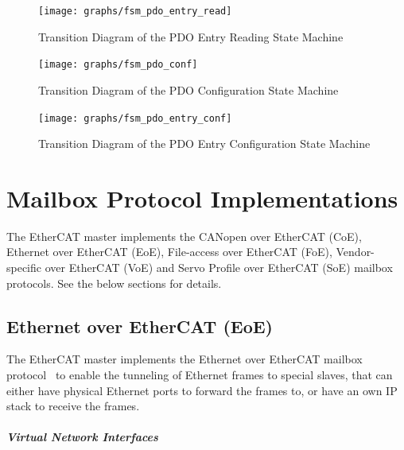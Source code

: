 \documentclass[a4paper,12pt,BCOR6mm,bibtotoc,idxtotoc]{scrbook}
\begin{document}
\begin{figure}[htbp]
  \centering
  \texttt{[image: graphs/fsm\_pdo\_entry\_read]}
  \caption{Transition Diagram of the PDO Entry Reading State Machine}
  \label{fig:fsm-pdo-entry-read}
\end{figure}

\begin{figure}[htbp]
  \centering
  \texttt{[image: graphs/fsm\_pdo\_conf]}
  \caption{Transition Diagram of the PDO Configuration State Machine}
  \label{fig:fsm-pdo-conf}
\end{figure}

\begin{figure}[htbp]
  \centering
  \texttt{[image: graphs/fsm\_pdo\_entry\_conf]}
  \caption{Transition Diagram of the PDO Entry Configuration State Machine}
  \label{fig:fsm-pdo-entry-conf}
\end{figure}


\chapter{Mailbox Protocol Implementations}

The EtherCAT master implements the CANopen over EtherCAT (CoE), Ethernet over
EtherCAT (EoE), File-access over EtherCAT (FoE), Vendor-specific over EtherCAT
(VoE) and Servo Profile over EtherCAT (SoE) mailbox protocols. See the below
sections for details.


\section{Ethernet over EtherCAT (EoE)}
\label{sec:eoe}

The EtherCAT master implements the
Ethernet over EtherCAT mailbox protocol~\cite[sec.~5.7]{alspec} to enable the tunneling of
Ethernet frames to special slaves, that can either have physical Ethernet
ports to forward the frames to, or have an own IP stack to receive the frames.

\paragraph{Virtual Network Interfaces}
\end{document}
